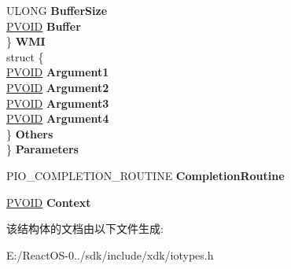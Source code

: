 \begin{DoxyCompactItemize}
\begin{tabbing}
\>\>ULONG {\bfseries BufferSize}\\
\>\>\hyperlink{interfacevoid}{PVOID} {\bfseries Buffer}\\
\>\} {\bfseries WMI}\\
\>struct \{\\
\>\>\hyperlink{interfacevoid}{PVOID} {\bfseries Argument1}\\
\>\>\hyperlink{interfacevoid}{PVOID} {\bfseries Argument2}\\
\>\>\hyperlink{interfacevoid}{PVOID} {\bfseries Argument3}\\
\>\>\hyperlink{interfacevoid}{PVOID} {\bfseries Argument4}\\
\>\} {\bfseries Others}\\
\} {\bfseries Parameters}\\

\end{tabbing}\item 
\mbox{\label{struct___i_o___s_t_a_c_k___l_o_c_a_t_i_o_n_ab49c0dbe0c5bce7825b955a4c6214b5d}} 
P\+I\+O\+\_\+\+C\+O\+M\+P\+L\+E\+T\+I\+O\+N\+\_\+\+R\+O\+U\+T\+I\+NE {\bfseries Completion\+Routine}
\item 
\mbox{\label{struct___i_o___s_t_a_c_k___l_o_c_a_t_i_o_n_a1fc52333091dae4d69d89d3277a4a60d}} 
\hyperlink{interfacevoid}{P\+V\+O\+ID} {\bfseries Context}
\end{DoxyCompactItemize}


该结构体的文档由以下文件生成\+:\begin{DoxyCompactItemize}
\item 
E\+:/\+React\+O\+S-\/0../sdk/include/xdk/iotypes.\+h\end{DoxyCompactItemize}
